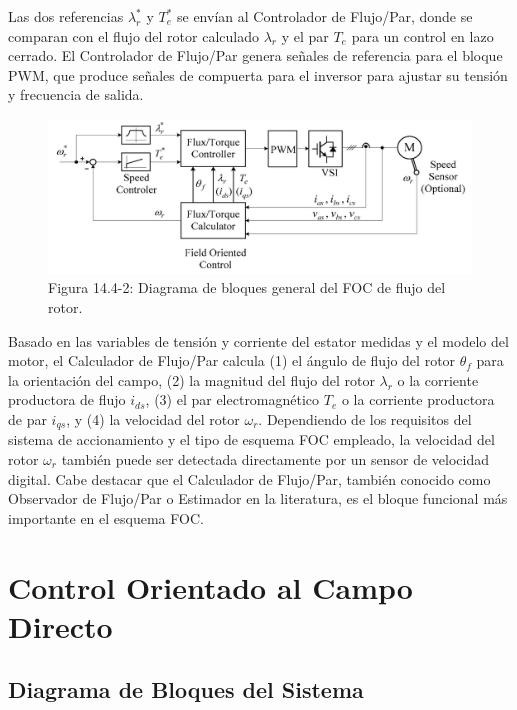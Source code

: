 \documentclass[letterpaper,12pt]{article} %
\begin{document}
Las dos referencias \( \lambda_r^* \) y \( T_e^* \) se envían al Controlador de Flujo/Par, donde se comparan con el flujo del rotor calculado \( \lambda_r \) y el par \( T_e \) para un control en lazo cerrado. El Controlador de Flujo/Par genera señales de referencia para el bloque PWM, que produce señales de compuerta para el inversor para ajustar su tensión y frecuencia de salida.

\begin{figure}[ht]
    \centering
    \includegraphics{graficos/img12.jpg} 
    \caption{Figura 14.4-2: Diagrama de bloques general del FOC de flujo del rotor.}
    \label{fig:14.4-2}
\end{figure}
\FloatBarrier

Basado en las variables de tensión y corriente del estator medidas y el modelo del motor, el Calculador de Flujo/Par calcula (1) el ángulo de flujo del rotor \( \theta_f \) para la orientación del campo, (2) la magnitud del flujo del rotor \( \lambda_r \) o la corriente productora de flujo \( i_{ds} \), (3) el par electromagnético \( T_e \) o la corriente productora de par \( i_{qs} \), y (4) la velocidad del rotor \( \omega_r \). Dependiendo de los requisitos del sistema de accionamiento y el tipo de esquema FOC empleado, la velocidad del rotor \( \omega_r \) también puede ser detectada directamente por un sensor de velocidad digital. Cabe destacar que el Calculador de Flujo/Par, también conocido como Observador de Flujo/Par o Estimador en la literatura, es el bloque funcional más importante en el esquema FOC.

\section{Control Orientado al Campo Directo}

\subsection{Diagrama de Bloques del Sistema}
\end{document}
